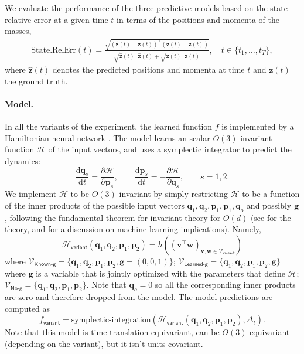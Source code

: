 \documentclass[accepted]{article}
\renewcommand{\mathcal}[1]{\mathscr{#1}} %
\begin{document}
We evaluate the performance of the three predictive models based on the state relative error at a given time $t$ in terms of the positions and momenta of the masses,
\begin{align}
    \text{State.RelErr}(t) =  \frac{\sqrt{(\hat{\mathbf{z}}(t)-\mathbf{z}(t))^\top (\hat{\mathbf{z}}(t)-\mathbf{z}(t))}}{\sqrt{\hat{\mathbf z}(t)^\top\hat{\mathbf z}(t)}+\sqrt{\mathbf z(t)^\top \mathbf z(t)}}, \quad t\in\{t_1,\ldots,t_T\},\label{eq:state_relerr}
\end{align}
where $\hat{\mathbf{z}}(t)$ denotes the predicted positions and momenta at time $t$ and $\mathbf{z}(t)$ the ground truth.


\paragraph{Model.} In all the variants of the experiment, the learned function $f$ is implemented by a Hamiltonian neural network \citep{sanchez-gonzalez2019hamiltonian}. The model learns an scalar $O(3)$-invariant function $\mathcal H$ of the input vectors, and uses a symplectic integrator to predict the dynamics:
\begin{equation}
    \frac{\mathrm{d}\mathbf q_s}{\mathrm{d}t} = \frac{\partial \mathcal H}{\partial \mathbf p_s}, \quad \quad \frac{\mathrm{d}\mathbf p_s}{\mathrm{d}t} = - \frac{\partial \mathcal H}{\partial \mathbf q_s}, \quad\quad s=1,2.
\end{equation}
We implement $\mathcal H$ to be $O(3)$-invariant by simply restricting $\mathcal H$ to be a function of the inner products of the possible input vectors $\mathbf q_1, \mathbf q_2, \mathbf p_1, \mathbf p_1, \mathbf q_o $ and possibly $\mathbf g$, following the fundamental theorem for invariant theory for $O(d)$ (see \citealt{weyl} for the theory, and \citealt{villar2021scalars} for a discussion on machine learning implications). Namely,
\begin{equation}\mathcal H_\textsf{variant} (\mathbf q_1, \mathbf q_2, \mathbf p_1, \mathbf p_2) = h((\mathbf v^\top \mathbf w)_{\mathbf v, \mathbf w \in \mathcal V_\textsf{variant}})
\end{equation}
where $\mathcal V_\textsf{Known-g} = \{\mathbf q_1, \mathbf q_2, \mathbf p_1, \mathbf p_2, \mathbf g=(0,0,1)\}$; $\mathcal V_\textsf{Learned-g} =\{\mathbf q_1, \mathbf q_2, \mathbf p_1, \mathbf p_2, \mathbf g\}$ where $\mathbf g$ is a variable that is jointly optimized with the parameters that define $\mathcal H$;  $\mathcal V_\textsf{No-g} = \{\mathbf q_1, \mathbf q_2, \mathbf p_1, \mathbf p_2\}$.
Note that $\mathbf q_o=0$ so all the corresponding inner products are zero and therefore dropped from the model.
The model predictions are computed as
\begin{equation} \label{eq:model_pendulum}
f_{\textsf{variant}} = \text{symplectic-integration}(\mathcal H_\textsf{variant} (\mathbf q_1, \mathbf q_2, \mathbf p_1, \mathbf p_2), \Delta_t).
\end{equation}
Note that this model is time-translation-equivariant, can be $O(3)$-equivariant (depending on the variant), but it isn't units-covariant. 
\end{document}
